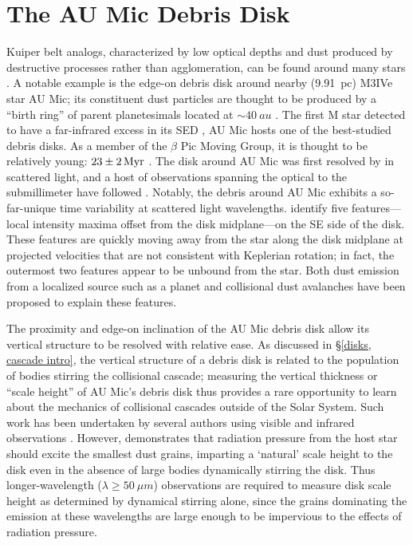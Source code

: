 \documentclass[12pt,oneside]{book}
\begin{document}
\section{The AU Mic Debris Disk}
\label{AU Mic intro}

Kuiper belt analogs, characterized by low optical depths and dust produced by destructive processes rather than agglomeration, can be found around many stars \citep{hughes18}.
A notable example is the edge-on debris disk around nearby (\SI{9.91}{pc}) M3IVe star AU Mic; its constituent dust particles are thought to be produced by a ``birth ring'' of parent planetesimals located at $\sim \SI{40}{au}$ \citep{vanleeuwen07, strubbe&chiang06}.
The first M star detected to have a far-infrared excess in its SED \citep[][see Figure \ref{fig: SED}]{moshir90}, AU Mic hosts one of the best-studied debris disks. 
As a member of the $\beta$ Pic Moving Group, it is thought to be relatively young: $\SI{23 \pm 2}{Myr}$ \citep{binks&jeffries14,mamajek&bell14,malo14}. 
The disk around AU Mic was first resolved by \cite{kalas04} in scattered light, and a host of observations spanning the optical to the submillimeter have followed \citep{augereau&beust06,macgregor13,matthews15,schneider14,wang15}. 
Notably, the debris around AU Mic exhibits a so-far-unique time variability at scattered light wavelengths.
\cite{boccaletti15} identify five features---local intensity maxima offset from the disk midplane---on the SE side of the disk. 
These features are quickly moving away from the star along the disk midplane at projected velocities that are not consistent with Keplerian rotation; in fact, the outermost two features appear to be unbound from the star. 
Both dust emission from a localized source such as a planet \citep{boccaletti15,sezestre17} and collisional dust avalanches \citep{chiang&fung17} have been proposed to explain these features.

The proximity and edge-on inclination of the AU Mic debris disk allow its vertical structure to be resolved with relative ease.
As discussed in \S \ref{disks, cascade intro}, the vertical structure of a debris disk is related to the population of bodies stirring the collisional cascade; measuring the vertical thickness or ``scale height'' of AU Mic's debris disk thus provides a rare opportunity to learn about the mechanics of collisional cascades outside of the Solar System.
Such work has been undertaken by several authors using visible and infrared observations \citep{artymowicz97,thebault&augereau07,quillen07}.
However, \cite{thebault09} demonstrates that radiation pressure from the host star should excite the smallest dust grains, imparting a `natural' scale height to the disk even in the absence of large bodies dynamically stirring the disk. 
Thus longer-wavelength ($\lambda \geq \SI{50}{\mu m}$) observations are required to measure disk scale height as determined by dynamical stirring alone, since the grains dominating the emission at these wavelengths are large enough to be impervious to the effects of radiation pressure.
\end{document}
